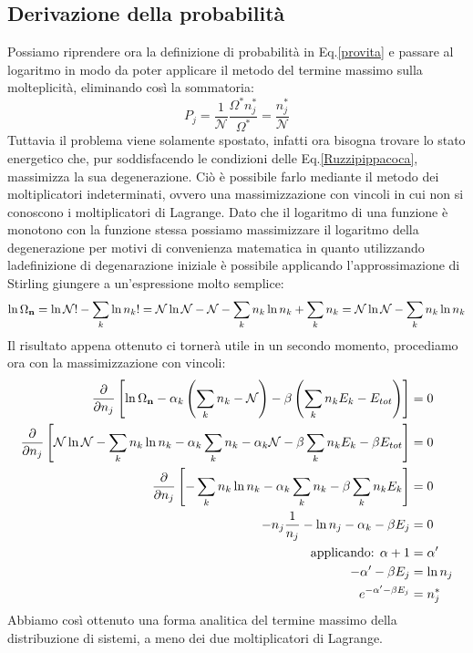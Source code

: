 \documentclass[oneside]{amsbook}
\numberwithin{section}{chapter}
\numberwithin{equation}{section}
\numberwithin{figure}{section}
\begin{document}
\subsection{Derivazione della probabilità}
Possiamo riprendere ora la definizione di probabilità in Eq.\ref{provita} e passare al logaritmo in modo da poter applicare il metodo del termine massimo sulla molteplicità, eliminando così la sommatoria:
\begin{equation}
P_j= \frac{1}{\mathcal{N}}\frac{\Omega^*n_{j}^*}{\Omega^*}=\frac{n_{j}^*}{\mathcal{N}}
\end{equation}
Tuttavia il problema viene solamente spostato, infatti ora bisogna trovare lo stato energetico che, pur soddisfacendo le condizioni delle Eq.\ref{Ruzzipippacoca}, massimizza la sua degenerazione. Ciò è possibile farlo mediante il metodo dei moltiplicatori indeterminati, ovvero una massimizzazione con vincoli in cui non si conoscono i moltiplicatori di Lagrange.
Dato che il logaritmo di una funzione è monotono con la funzione stessa possiamo massimizzare il logaritmo della degenerazione per motivi di convenienza matematica in quanto utilizzando ladefinizione di degenarazione iniziale è possibile applicando l'approssimazione di Stirling giungere a un'espressione molto semplice: 
\begin{equation}
\ln \Omega_\bold{n}= \ln \mathcal{N}! - \sum_k \ln n_k!= \mathcal{N} \ln \mathcal{N} - \mathcal{N}- \sum_k n_k\ln n_k + \sum_k  n_k = \mathcal{N} \ln \mathcal{N}- \sum_k n_k\ln n_k 
\end{equation}
Il risultato appena ottenuto ci tornerà utile in un secondo momento, procediamo ora con la massimizzazione con vincoli:
\begin{equation}
\begin{aligned}
\frac{\partial}{\partial n_j}\left[\ln \Omega_\bold{n} - \alpha_k \left(\sum_k  n_k -\mathcal{N}\right) -\beta \left(\sum_k  n_k E_k - E_{tot} \right)\right] &=0\\
\frac{\partial}{\partial n_j}\left[\mathcal{N} \ln \mathcal{N}- \sum_k n_k\ln n_k  - \alpha_k \sum_k  n_k -\alpha_k\mathcal{N} -\beta \sum_k  n_k E_k - \beta E_{tot}\right] &=0\\
\frac{\partial}{\partial n_j}\left[- \sum_k n_k\ln n_k  - \alpha_k \sum_k  n_k -\beta \sum_k  n_k E_k \right] &=0\\
-n_j \frac{1}{n_j} -\ln n_j -\alpha_k -\beta E_j &=0 \\
\text{applicando: } \alpha+1&=\alpha^\prime\\
 -\alpha^\prime-\beta	E_j&= \ln n_j \\
 e^{ -\alpha^\prime-\beta	E_j} &= n_j ^*
\end{aligned}
\end{equation}
Abbiamo così ottenuto una forma analitica del termine massimo della distribuzione di sistemi, a meno dei due moltiplicatori di Lagrange.
\end{document}
